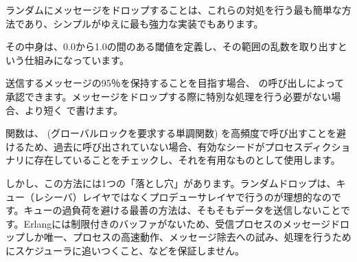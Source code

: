 ランダムにメッセージをドロップすることは、これらの対処を行う最も簡単な方法であり、シンプルがゆえに最も強力な実装でもあります。

その中身は、0.0から1.0の間のある閾値を定義し、その範囲の乱数を取り出すという仕組みになっています。


送信するメッセージの95％を保持することを目指す場合、  の呼び出しによって承認できます。メッセージをドロップする際に特別な処理を行う必要がない場合、より短く  で書けます。

関数は、 (グローバルロックを要求する単調関数) を高頻度で呼び出すことを避けるため、過去に呼び出されていない場合、有効なシードがプロセスディクショナリに存在していることをチェックし、それを有用なものとして使用します。

しかし、この方法には1つの「落とし穴」があります。ランダムドロップは、キュー（レシーバ）レイヤではなくプロデューサレイヤで行うのが理想的なのです。キューの過負荷を避ける最善の方法は、そもそもデータを送信しないことです。Erlangには制限付きのバッファがないため、受信プロセスのメッセージドロップしか唯一、プロセスの高速動作、メッセージ除去への試み、処理を行うためにスケジューラに追いつくこと、などを保証しません。

